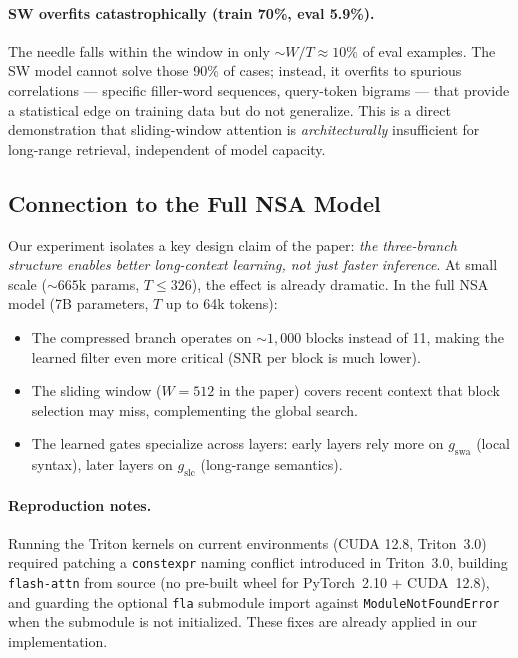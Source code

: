 \documentclass[10pt,twocolumn]{article}
\begin{document}
\paragraph{SW overfits catastrophically (train 70\%, eval 5.9\%).}
The needle falls within the window in only $\sim W/T \approx 10\%$ of eval examples.
The SW model cannot solve those 90\% of cases; instead, it overfits to spurious
correlations — specific filler-word sequences, query-token bigrams — that provide
a statistical edge on training data but do not generalize.
This is a direct demonstration that sliding-window attention is \emph{architecturally}
insufficient for long-range retrieval, independent of model capacity.

\subsection{Connection to the Full NSA Model}

Our experiment isolates a key design claim of the paper:
\emph{the three-branch structure enables better long-context learning, not just faster
inference}. At small scale (${\sim}665$k params, $T \leq 326$), the effect is already
dramatic. In the full NSA model (7B parameters, $T$ up to 64k tokens):
\begin{itemize}[leftmargin=*,noitemsep,topsep=2pt]
  \item The compressed branch operates on ${\sim}1{,}000$ blocks instead of 11,
        making the learned filter even more critical (SNR per block is much lower).
  \item The sliding window ($W = 512$ in the paper) covers recent context that
        block selection may miss, complementing the global search.
  \item The learned gates specialize across layers: early layers rely more on
        $g_\text{swa}$ (local syntax), later layers on $g_\text{slc}$ (long-range semantics).
\end{itemize}

\paragraph{Reproduction notes.}
Running the Triton kernels on current environments (CUDA 12.8, Triton~3.0) required
patching a \texttt{constexpr} naming conflict introduced in Triton~3.0,
building \texttt{flash-attn} from source (no pre-built wheel for PyTorch~2.10 + CUDA~12.8),
and guarding the optional \texttt{fla} submodule import against \texttt{ModuleNotFoundError}
when the submodule is not initialized.
These fixes are already applied in our implementation.
\end{document}
